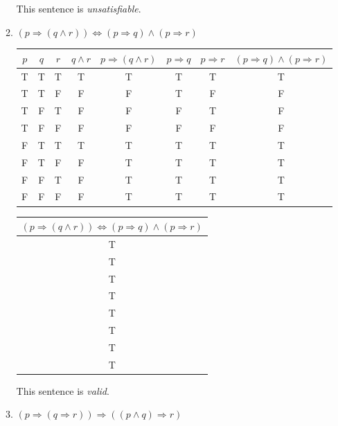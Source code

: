 \documentclass{article}
\begin{document}
\begin{enumerate}
\begin{enumerate}
				This sentence is \emph{unsatisfiable}.
				
			\item $(p \Rightarrow ( q \wedge r)) \Leftrightarrow (p \Rightarrow q) \wedge (p \Rightarrow r)$
			
				\begin{tabular}{|c|c|c|c|c|c|c|c|}
					\hline
					$p$ & $q$ & $r$ & $q \wedge r$ & $p \Rightarrow (q \wedge r)$ & $p \Rightarrow q$ 
					& $p \Rightarrow r$ & $ (p \Rightarrow q) \wedge (p \Rightarrow r)$\\
					\hline
					T & T & T & T & T & T & T & T\\
					\hline
					T & T & F & F & F & T & F & F\\
					\hline
					T & F & T & F & F & F & T & F\\
					\hline
					T & F & F & F & F & F & F & F\\
					\hline
					F & T & T & T & T & T & T & T\\
					\hline
					F & T & F & F & T & T & T & T\\
					\hline
					F & F & T & F & T & T & T & T\\
					\hline
					F & F & F & F & T & T & T & T \\
					\hline
				\end{tabular}

				\begin{tabular}{|c|}
					\hline
					 $(p \Rightarrow ( q \wedge r)) \Leftrightarrow (p \Rightarrow q) \wedge (p \Rightarrow r)$ \\
					\hline
					T \\
					\hline
					T \\
					\hline
					T \\
					\hline
					T \\
					\hline
					T \\
					\hline
					T \\
					\hline
					T \\
					\hline
					T \\
					\hline
				\end{tabular}

				This sentence is \emph{valid}.

				\item $(p \Rightarrow (q \Rightarrow r)) \Rightarrow ((p \wedge q) \Rightarrow r)$


\end{enumerate}
\end{enumerate}
\end{document}
